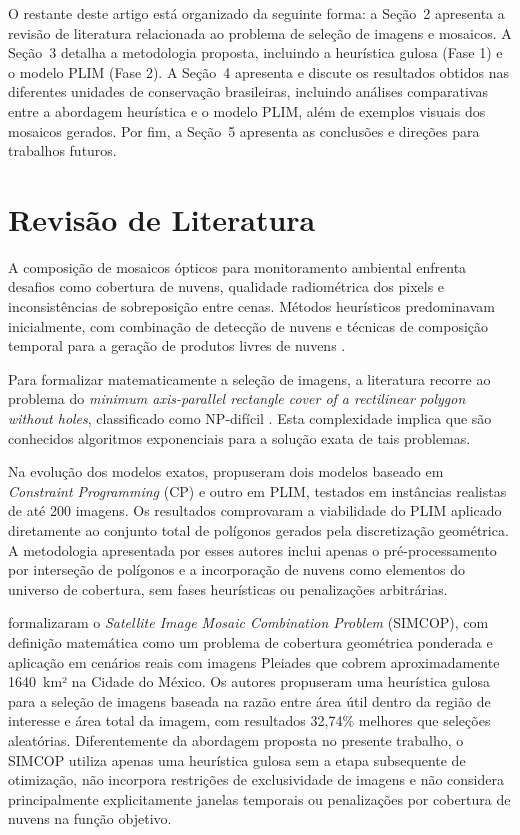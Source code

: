 \documentclass[a4paper,11pt]{article}
\begin{document}
O restante deste artigo está organizado da seguinte forma: a Seção~2 apresenta a revisão de literatura relacionada ao problema de seleção de imagens e mosaicos. A Seção~3 detalha a metodologia proposta, incluindo a heurística gulosa (Fase 1) e o modelo PLIM (Fase 2). A Seção~4 apresenta e discute os resultados obtidos nas diferentes unidades de conservação brasileiras, incluindo análises comparativas entre a abordagem heurística e o modelo PLIM, além de exemplos visuais dos mosaicos gerados. Por fim, a Seção~5 apresenta as conclusões e direções para trabalhos futuros.
\vspace{-6mm}
\section{Revisão de Literatura}
\vspace{-3mm}
A composição de mosaicos ópticos para monitoramento ambiental enfrenta desafios como cobertura de nuvens, qualidade radiométrica dos pixels e inconsistências de sobreposição entre cenas. Métodos heurísticos predominavam inicialmente, com combinação de detecção de nuvens e técnicas de composição temporal para a geração de produtos livres de nuvens \citep{kempeneers:2017}.

Para formalizar matematicamente a seleção de imagens, a literatura recorre ao problema do \emph{minimum axis-parallel rectangle cover of a rectilinear polygon without holes}, classificado como NP-difícil \citep{KumarRamesh1995, masek1978}. Esta complexidade implica que são conhecidos algoritmos exponenciais para a solução exata de tais problemas. 

Na evolução dos modelos exatos, \citet{combarro-simon-constraint-2023} propuseram dois modelos baseado em \textit{Constraint Programming} (CP) e outro em PLIM, testados em instâncias realistas de até 200 imagens. Os resultados comprovaram a viabilidade do PLIM aplicado diretamente ao conjunto total de polígonos gerados pela discretização geométrica. A metodologia apresentada por esses autores inclui apenas o pré-processamento por interseção de polígonos e a incorporação de nuvens como elementos do universo de cobertura, sem fases heurísticas ou penalizações arbitrárias.

\citet{combarro-simon-simcop:2023} formalizaram o \textit{Satellite Image Mosaic Combination Problem} (SIMCOP), com definição matemática como um problema de cobertura geométrica ponderada e aplicação em cenários reais com imagens Pleiades que cobrem aproximadamente 1640~km² na Cidade do México. Os autores propuseram uma heurística gulosa para a seleção de imagens baseada na razão entre área útil dentro da região de interesse e área total da imagem, com resultados 32,74\% melhores que seleções aleatórias. Diferentemente da abordagem proposta no presente trabalho, o SIMCOP utiliza apenas uma heurística gulosa sem a etapa subsequente de otimização, não incorpora restrições de exclusividade de imagens e não considera principalmente explicitamente janelas temporais ou penalizações por cobertura de nuvens na função objetivo.
\end{document}

